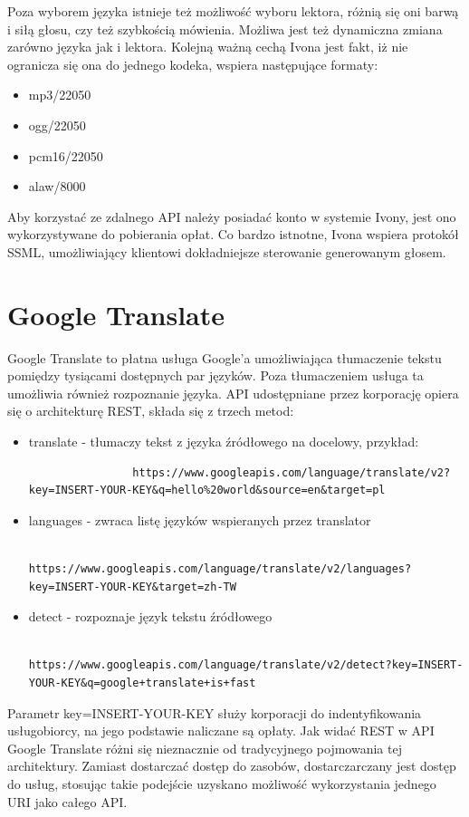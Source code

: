Poza wyborem języka istnieje też możliwość wyboru lektora, różnią się oni barwą i siłą głosu, czy też szybkością mówienia. Możliwa jest też dynamiczna zmiana zarówno języka jak i lektora. Kolejną ważną cechą Ivona jest fakt, iż nie ogranicza się ona do jednego kodeka, wspiera następujące formaty:
\begin{itemize}
	\item mp3/22050
	\item ogg/22050
	\item pcm16/22050
	\item alaw/8000
\end{itemize}
 Aby korzystać ze zdalnego API należy posiadać konto w systemie Ivony, jest ono wykorzystywane do pobierania opłat. Co bardzo istnotne, Ivona wspiera protokół SSML, umożliwiający klientowi dokładniejsze sterowanie generowanym głosem. 

\section{Google Translate}
Google Translate to płatna usługa Google'a umożliwiająca tłumaczenie tekstu pomiędzy tysiącami dostępnych par języków. Poza tłumaczeniem usługa ta umożliwia również rozpoznanie języka. API udostępniane przez korporację opiera się o architekturę REST, składa się z trzech metod:
\begin{itemize}
	\item translate - tłumaczy tekst z języka źródłowego na docelowy, przykład:
			\begin{lstlisting}
				https://www.googleapis.com/language/translate/v2?key=INSERT-YOUR-KEY&q=hello%20world&source=en&target=pl
			\end{lstlisting}
	\item languages - zwraca listę języków wspieranych przez translator
			\begin{lstlisting}
				https://www.googleapis.com/language/translate/v2/languages?key=INSERT-YOUR-KEY&target=zh-TW
			\end{lstlisting}
	\item detect - rozpoznaje język tekstu źródłowego
			\begin{lstlisting}
				https://www.googleapis.com/language/translate/v2/detect?key=INSERT-YOUR-KEY&q=google+translate+is+fast
			\end{lstlisting}
\end{itemize}
Parametr key=INSERT-YOUR-KEY służy korporacji do indentyfikowania usługobiorcy, na jego podstawie naliczane są opłaty. Jak widać REST w API Google Translate różni się nieznacznie od tradycyjnego pojmowania tej architektury. Zamiast dostarczać dostęp do zasobów, dostarczarczany jest dostęp do usług, stosując takie podejście uzyskano możliwość wykorzystania jednego URI jako całego API. 

